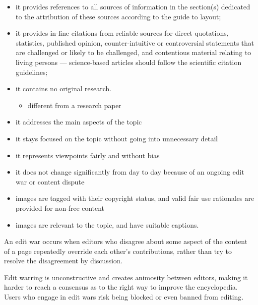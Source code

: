 \documentclass[a4paper,landscape,headrule,footrule,xetex]{foils}
\begin{document}
\begin{itemize}
\item  it provides references to all sources of information in the section(s) dedicated to the attribution of these sources according to the guide to layout;
\item  it provides in-line citations from reliable sources for direct quotations, statistics, published opinion, counter-intuitive or controversial statements that are challenged or likely to be challenged, and contentious material relating to living persons
--- science-based articles should follow the scientific citation guidelines;
\item it contains no original research.
  \begin{itemize}
  \item different from a research paper
  \end{itemize}
\end{itemize}

\begin{itemize}
\item  it addresses the main aspects of the topic
\item  it stays focused on the topic without going into unnecessary detail
\end{itemize}

\begin{itemize}
\item  it represents viewpoints fairly and without bias
\item it does not change significantly from day to day because of an ongoing edit war or content dispute
\item  images are tagged with their copyright status, and valid fair use rationales are provided for non-free content
\item  images are relevant to the topic, and have suitable captions.
\end{itemize}




\MyLogo{}
An edit war occurs when editors who disagree about some aspect of the
content of a page repeatedly override each other's contributions,
rather than try to resolve the disagreement by discussion.

Edit warring is unconstructive and creates animosity between editors,
making it harder to reach a consensus as to the right way to improve
the encyclopedia. Users who engage in edit wars risk being blocked or
even banned from editing.
\end{document}
